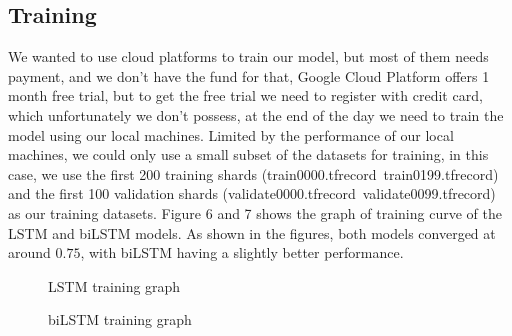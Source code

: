 \documentclass{article}
\begin{document}
\subsection{Training}
We wanted to use cloud platforms to train our model, but most of them needs payment, and we don't have the fund for that, Google Cloud Platform offers 1 month free trial, but to get the free trial we need to register with credit card, which unfortunately we don't possess, at the end of the day we need to train the model using our local machines. Limited by the performance of our local machines, we could only use a small subset of the datasets for training, in this case, we use the first 200 training shards (train0000.tfrecord~train0199.tfrecord) and the first 100 validation shards (validate0000.tfrecord~validate0099.tfrecord) as our training datasets. Figure 6 and 7 shows the graph of training curve of the LSTM and biLSTM models. As shown in the figures, both models converged at around $0.75$, with biLSTM having a slightly better performance.

\begin{figure}
  \centering
  \caption{LSTM training graph}
\end{figure}

\begin{figure}
  \centering
  \caption{biLSTM training graph}
\end{figure}
\end{document}
